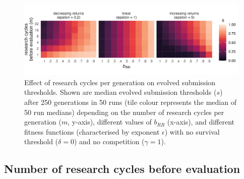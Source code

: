 \documentclass[
  ,man,mask,floatsintext]{apa6}
\begin{document}
\begin{figure}

{\centering \includegraphics[width=1\linewidth]{plots/plot_m_evo_rocket} 

}

\caption{Effect of research cycles per generation on evolved submission thresholds. Shown are median evolved submission thresholds (\(s\)) after 250 generations in 50 runs (tile colour represents the median of 50 run medians) depending on the number of research cycles per generation (\(m\), y-axis), different values of \(b_{RR}\) (x-axis), and different fitness functions (characterised by exponent \(\epsilon\)) with no survival threshold (\(\delta = 0\)) and no competition (\(\gamma = 1\)).}\label{fig:mplot}
\end{figure}

\hypertarget{number-of-research-cycles-before-evaluation}{%
\subsection{Number of research cycles before evaluation}\label{number-of-research-cycles-before-evaluation}}
\end{document}
